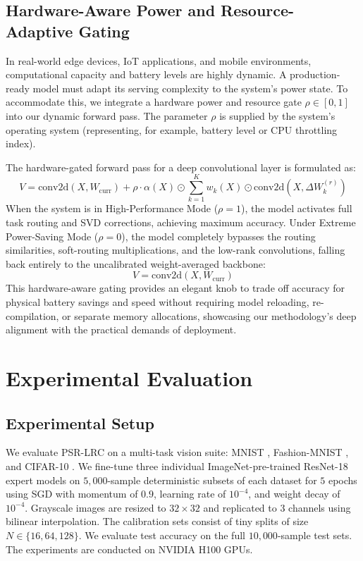 \documentclass{article}
\theoremstyle{plain}
\theoremstyle{definition}
\theoremstyle{remark}
\begin{document}
\subsection{Hardware-Aware Power and Resource-Adaptive Gating}
In real-world edge devices, IoT applications, and mobile environments, computational capacity and battery levels are highly dynamic. A production-ready model must adapt its serving complexity to the system's power state. 
To accommodate this, we integrate a hardware power and resource gate $\rho \in [0, 1]$ into our dynamic forward pass. The parameter $\rho$ is supplied by the system's operating system (representing, for example, battery level or CPU throttling index). 

The hardware-gated forward pass for a deep convolutional layer is formulated as:
\begin{equation}
    V = \text{conv2d}(X, W_{\text{curr}}) + \rho \cdot \alpha(X) \odot \sum_{k=1}^K w_k(X) \odot \text{conv2d}(X, \Delta W_k^{(r)})
\end{equation}
When the system is in High-Performance Mode ($\rho = 1$), the model activates full task routing and SVD corrections, achieving maximum accuracy. Under Extreme Power-Saving Mode ($\rho = 0$), the model completely bypasses the routing similarities, soft-routing multiplications, and the low-rank convolutions, falling back entirely to the uncalibrated weight-averaged backbone:
\begin{equation}
    V = \text{conv2d}(X, W_{\text{curr}})
\end{equation}
This hardware-aware gating provides an elegant knob to trade off accuracy for physical battery savings and speed without requiring model reloading, re-compilation, or separate memory allocations, showcasing our methodology's deep alignment with the practical demands of deployment.

\section{Experimental Evaluation}
\label{sec:eval}

\subsection{Experimental Setup}
We evaluate PSR-LRC on a multi-task vision suite: MNIST \cite{lecun1998gradient}, Fashion-MNIST \cite{xiao2017fashion}, and CIFAR-10 \cite{krizhevsky2009learning}. We fine-tune three individual ImageNet-pre-trained ResNet-18 expert models on $5,000$-sample deterministic subsets of each dataset for $5$ epochs using SGD with momentum of $0.9$, learning rate of $10^{-4}$, and weight decay of $10^{-4}$. Grayscale images are resized to $32 \times 32$ and replicated to 3 channels using bilinear interpolation. The calibration sets consist of tiny splits of size $N \in \{16, 64, 128\}$. We evaluate test accuracy on the full $10,000$-sample test sets. The experiments are conducted on NVIDIA H100 GPUs.
\end{document}
